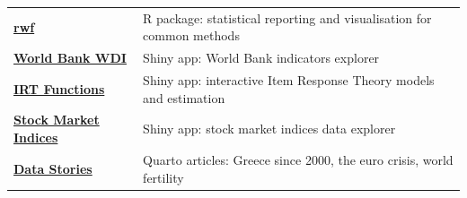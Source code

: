 \documentclass[
  a4paper,
]{article}
\begin{document}
\begin{tcolorbox}[sectionbox, title=Projects]
\begin{tabularx}{\linewidth}{@{}>{\raggedright\arraybackslash\hyphenpenalty=10000}p{2.9cm} X@{}}
  \href{https://sedzinfo.github.io/rwf/}{\textbf{\textcolor{linkblue}{rwf}}} & \small R package: statistical reporting and visualisation for common methods\\[2pt]
  \href{https://sedzinfo.shinyapps.io/golemworldbank/}{\textbf{\textcolor{linkblue}{World Bank WDI}}} & \small Shiny app: World Bank indicators explorer\\[2pt]
  \href{https://sedzinfo-golemirt.share.connect.posit.cloud/}{\textbf{\textcolor{linkblue}{IRT Functions}}} & \small Shiny app: interactive Item Response Theory models and estimation\\[2pt]
  \href{https://sedzinfo-golemstockindices.share.connect.posit.cloud/}{\textbf{\textcolor{linkblue}{Stock Market Indices}}} & \small Shiny app: stock market indices data explorer\\[2pt]
  \href{https://sedzinfo.github.io/vignettes/illustration/}{\textbf{\textcolor{linkblue}{Data Stories}}} & \small Quarto articles: Greece since 2000, the euro crisis, world fertility\\[2pt]
\end{tabularx}
\end{tcolorbox}
\end{document}
